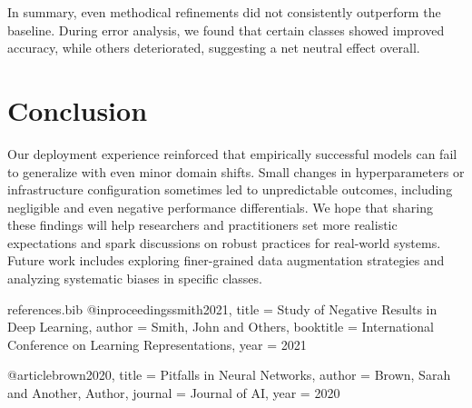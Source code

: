 \documentclass{article}
\begin{document}
In summary, even methodical refinements did not consistently outperform the baseline. During error analysis, we found that certain classes showed improved accuracy, while others deteriorated, suggesting a net neutral effect overall.

\section{Conclusion}
Our deployment experience reinforced that empirically successful models can fail to generalize with even minor domain shifts. Small changes in hyperparameters or infrastructure configuration sometimes led to unpredictable outcomes, including negligible and even negative performance differentials. We hope that sharing these findings will help researchers and practitioners set more realistic expectations and spark discussions on robust practices for real-world systems. Future work includes exploring finer-grained data augmentation strategies and analyzing systematic biases in specific classes.




\begin{filecontents}{references.bib}
@inproceedings{smith2021,
  title     = {Study of Negative Results in Deep Learning},
  author    = {Smith, John and Others},
  booktitle = {International Conference on Learning Representations},
  year      = {2021}
}

@article{brown2020,
  title   = {Pitfalls in Neural Networks},
  author  = {Brown, Sarah and Another, Author},
  journal = {Journal of AI},
  year    = {2020}
}
\end{filecontents}
\end{document}
